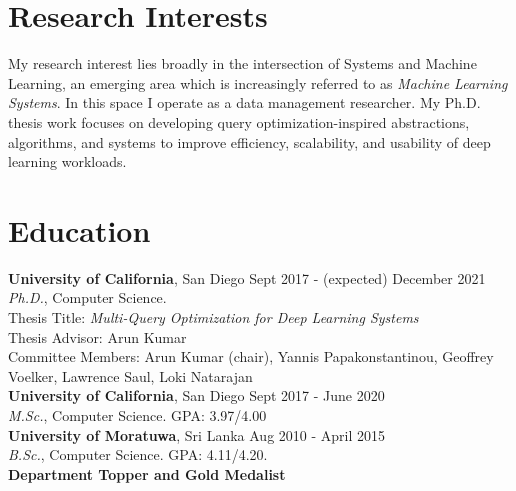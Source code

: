 \documentclass[margin]{res}
\begin{document}

\address{Phone: (+1) 812-558-6888\\ Email: snakanda@eng.ucsd.edu\\ Web: \href{https://scnakandala.github.io}{https://scnakandala.github.io}}
\address{3232 EBU3B CSE\\9500 Gilman Drive\\La Jolla, CA 92093}


\begin{resume}
\vspace{-2mm}
\section{Research Interests}
My research interest lies broadly in the intersection of Systems and Machine Learning, an emerging area which is increasingly referred to as \textit{Machine Learning Systems}. In this space I operate as a data management researcher. My Ph.D. thesis work focuses on developing query optimization-inspired abstractions, algorithms, and systems to improve efficiency, scalability, and usability of deep learning workloads.


\section{Education}
\textbf{University of California}, San Diego \hfill Sept 2017 - (expected) December 2021\\ 
{\sl Ph.D.}, Computer Science.\\
Thesis Title: \textit{Multi-Query Optimization for Deep Learning Systems}\\
\quad Thesis Advisor: Arun Kumar\\
\quad Committee Members: Arun Kumar (chair), Yannis Papakonstantinou, Geoffrey Voelker, Lawrence Saul, Loki Natarajan\\

\vspace{-5mm}
\textbf{University of California}, San Diego \hfill Sept 2017 - June 2020\\
{\sl M.Sc.}, Computer Science. GPA: 3.97/4.00\\

\vspace{-5mm}
\textbf{University of Moratuwa}, Sri Lanka \hfill Aug 2010 - April 2015\\
{\sl B.Sc.}, Computer Science. GPA: 4.11/4.20.\\
\textbf{Department Topper and Gold Medalist}\\



\end{resume}
\end{document}
